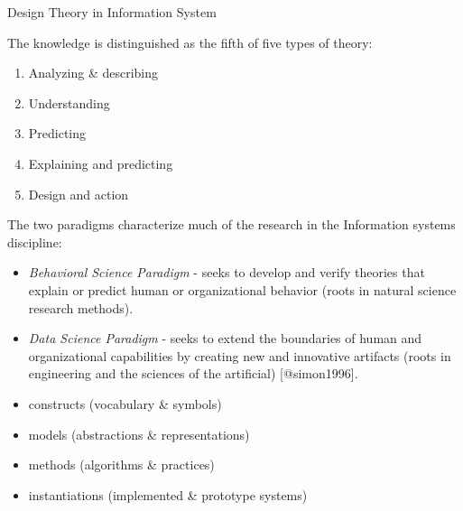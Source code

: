 \documentclass[
]{article}
\providecommand{\tightlist}{%
  \setlength{\itemsep}{0pt}\setlength{\parskip}{0pt}}
\begin{document}
Design Theory in Information System

The knowledge is distinguished as the fifth of five types of theory:

\begin{enumerate}
\def\labelenumi{\arabic{enumi}.}
\tightlist
\item
  Analyzing \& describing
\item
  Understanding
\item
  Predicting
\item
  Explaining and predicting
\item
  Design and action
\end{enumerate}


The two paradigms characterize much of the research in the Information
systems discipline:

\begin{itemize}
\tightlist
\item
  \emph{Behavioral Science Paradigm} - seeks to develop and verify
  theories that explain or predict human or organizational behavior
  (roots in natural science research methods).
\item
  \emph{Data Science Paradigm} - seeks to extend the boundaries of human
  and organizational capabilities by creating new and innovative
  artifacts (roots in engineering and the sciences of the artificial)
  {[}@simon1996{]}.
\end{itemize}


\begin{itemize}
\tightlist
\item
  constructs (vocabulary \& symbols)
\item
  models (abstractions \& representations)
\item
  methods (algorithms \& practices)
\item
  instantiations (implemented \& prototype systems)
\end{itemize}

\end{document}
